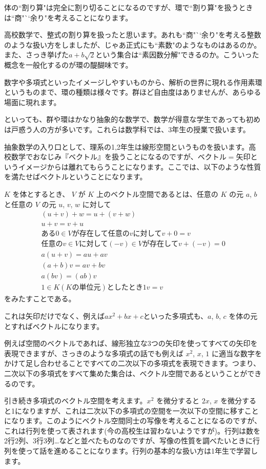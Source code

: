 体の``割り算"は完全に割り切ることになるのですが、環で``割り算"を扱うときは``商"``余り"を考えることになります。

高校数学で、整式の割り算を扱ったと思います。あれも``商"``余り"を考える整数のような扱い方をしましたが、じゃあ正式にも``素数"のようなものはあるのか。また、さっき挙げた$a + b\sqrt{2}$という集合は``素因数分解"できるのか。こういった概念を一般化するのが環の醍醐味です。

数字や多項式といったイメージしやすいものから、解析の世界に現れる作用素環というものまで、環の種類は様々です。群ほど自由度はありませんが、あらゆる場面に現れます。



といっても、群や環はかなり抽象的な数学で、数学が得意な学生であっても初めは戸惑う人の方が多いです。これらは数学科では、3年生の授業で扱います。

抽象数学の入り口として、理系の1,2年生は線形空間というものを扱います。高校数学でおなじみ『ベクトル』を扱うことになるのですが、$ベクトル = 矢印$というイメージからは離れてもらうことになります。ここでは、以下のような性質を満たせばベクトルということになります。

$K$ を体とするとき、 $V$ が $K$ 上のベクトル空間であるとは、任意の $K$ の元 $a$, $b$ と任意の $V$ の元 $u$, $v$, $w$ に対して
\begin{gather*}
(u + v) + w = u + (v + w) \\
u + v = v + u \\
ある0 \in V が存在して任意のvに対して v + 0 = v \\
任意のv \in V に対して (-v) \in Vが存在して v + (-v) = 0 \\
a(u + v) = au + av \\
(a + b)v = av + bv \\
a(bv) = (ab)v \\
1 \in K(Kの単位元)としたとき 1v = v
\end{gather*}
をみたすことである。



これは矢印だけでなく、例えば$ax^2 + bx + c$といった多項式も、$a$, $b$, $c$ を体の元とすればベクトルになります。

例えば空間のベクトルであれば、線形独立な3つの矢印を使ってすべての矢印を表現できますが、さっきのような多項式の話でも例えば $x^2$, $x$, $1$ に適当な数字をかけて足し合わせることですべての二次以下の多項式を表現できます。つまり、二次以下の多項式をすべて集めた集合は、ベクトル空間であるということができるのです。

引き続き多項式のベクトル空間を考えます。$x^2$ を微分すると $2x$, $x$ を微分すると1になりますが、これは二次以下の多項式の空間を一次以下の空間に移すことになります。このようにベクトル空間同士の写像を考えることになるのですが、これは行列を使って表されます(今の高校生は習わないようですが)。行列は数を2行2列、3行3列…などと並べたものなのですが、写像の性質を調べたいときに行列を使って話を進めることになります。行列の基本的な扱い方は1年生で学習します。

